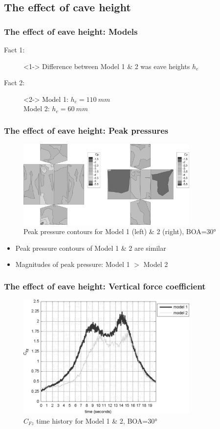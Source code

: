 \documentclass{beamer}
\begin{document}
\subsection{The effect of cave height}
\begin{frame}
	\frametitle{The effect of eave height: Models}
	\begin{description}
		\item[Fact 1: ]<1-> Difference between Model 1 \& 2 was \alert{eave heights $h_e$}
		\item[Fact 2: ]<2-> Model 1:  $h_e=\SI{110}{mm}$ \\
		                                         Model 2:  $h_e=\SI{60}{mm}$
	\end{description}
\end{frame}
\begin{frame}
	\frametitle{The effect of eave height: Peak pressures}
	\begin{figure}
		\centering
		\includegraphics[width=0.8\textwidth]{./fig/4.jpg}
		\caption{Peak pressure contours for Model 1 (left) \& 2 (right), BOA=\ang{30}}
	\end{figure}
	\begin{itemize}
		\item Peak pressure contours of Model 1 \& 2 are similar
		\item Magnitudes of peak pressure: Model 1 $>$ Model 2
	\end{itemize}
\end{frame}

\begin{frame}
	\frametitle{The effect of eave height: Vertical force coefficient}
	\begin{figure}
		\includegraphics[width=0.8\textwidth]{./fig/5.jpg}
		\caption{$C_{Fz}$ time history for Model 1 \& 2, BOA=\ang{30}}
	\end{figure}
\end{frame}
\end{document}
